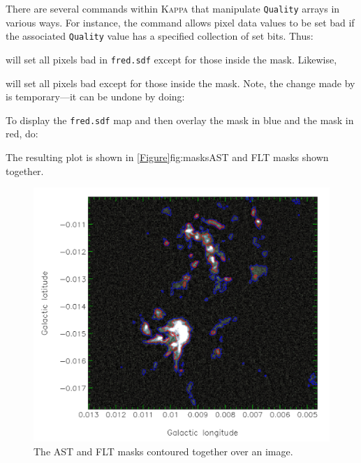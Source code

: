 
There are several commands within \textsc{Kappa} that manipulate
\texttt{Quality} arrays in various ways. For instance, the
 command allows pixel data values to
be set bad if the associated \texttt{Quality} value has a specified
collection of set bits. Thus:

\begin{terminalv}
\end{terminalv}

will set all pixels bad in \texttt{fred.sdf} except for those inside the
 mask. Likewise,

\begin{terminalv}
\end{terminalv}

will set all pixels bad except for those inside the  mask.  Note, the
change made by  is temporary---it can be undone by doing:

\begin{terminalv}
\end{terminalv}

To display the \texttt{fred.sdf} map and then overlay the  mask in blue
and the  mask in red, do:

\begin{terminalv}
\end{terminalv}

The resulting plot is shown in \cref{Figure}{fig:masks}{AST and FLT masks
shown together}.

\begin{figure}[t!]
\includegraphics[width=0.6\linewidth]{sc21_masks}
\caption[AST and FLT masks shown together]{The AST and FLT masks contoured
together over an image.}
\label{fig:masks}
\end{figure}

